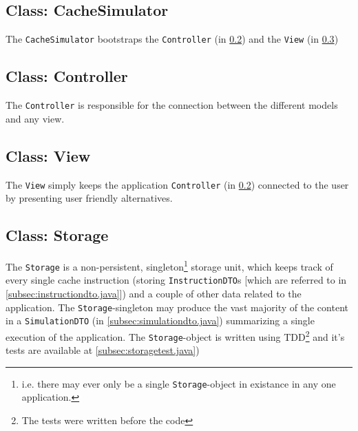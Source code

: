 \documentclass[a4paper]{scrreprt}
\begin{document}
\subsection{Class: CacheSimulator}
\label{subsec:cachesimulator.java}

The \texttt{CacheSimulator} bootstraps the \texttt{Controller} (in \ref{subsec:controller.java}) and the \texttt{View} (in \ref{subsec:view.java})



\subsection{Class: Controller}
\label{subsec:controller.java}

The \texttt{Controller} is responsible for the connection between the different models and any view.



\subsection{Class: View}
\label{subsec:view.java}

The \texttt{View} simply keeps the application \texttt{Controller} (in \ref{subsec:controller.java}) connected to the user by presenting user friendly alternatives.



\subsection{Class: Storage}
\label{subsec:storage.java}

The \texttt{Storage} is a non-persistent, singleton\footnote{i.e. there may ever only be a single \texttt{Storage}-object in existance in any one application.} storage unit, which keeps track of every single cache instruction (storing \texttt{InstructionDTO}s [which are referred to in \ref{subsec:instructiondto.java}]) and a couple of other data related to the application. The \texttt{Storage}-singleton may produce the vast majority of the content in a \texttt{SimulationDTO} (in \ref{subsec:simulationdto.java}) summarizing a single execution of the application. The \texttt{Storage}-object is written using TDD\footnote{The tests were written before the code} and it's tests are available at \ref{subsec:storagetest.java})
\end{document}
